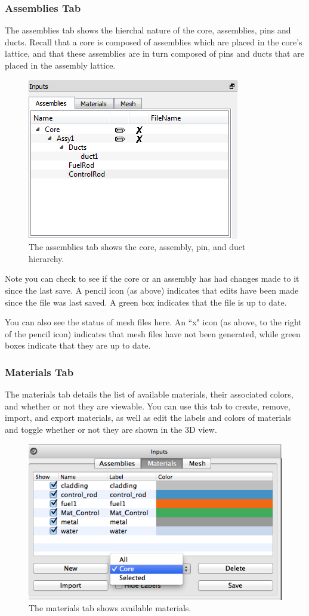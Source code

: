 \subsubsection{Assemblies Tab}
The assemblies tab shows the hierchal nature of the core, assemblies, pins and ducts.  Recall that a core is composed of assemblies which are placed in the core's lattice, and that these assemblies are in turn composed of pins and ducts that are placed in the assembly lattice.

\begin{figure}[H]
	\begin{center}
		\includegraphics[width=0.5\linewidth]{Images/assemblies-tab.png}
		\caption{The assemblies tab shows the core, assembly, pin, and duct hierarchy.}
		\label{fig:mainwindow2}
	\end{center}
\end{figure}

Note you can check to see if the core or an assembly has had changes made to it since the last save.  A pencil icon (as above) indicates that edits have been made since the file was last saved.  A green box indicates that the file is up to date.

You can also see the status of mesh files here.  An ``x" icon (as above, to the right of the pencil icon) indicates that mesh files have not been generated, while green boxes indicate that they are up to date.

\subsubsection{Materials Tab}
The materials tab details the list of available materials, their associated colors, and whether or not they are viewable.  You can use this tab to create, remove, import, and export materials, as well as edit the labels and colors of materials and toggle whether or not they are shown in the 3D view.

\begin{figure}[h]
	\begin{center}
		\includegraphics[width=0.5\linewidth]{Images/materials-tab.png}
		\caption{The materials tab shows available materials.}
		\label{fig:mainwindow3}
	\end{center}
\end{figure}

